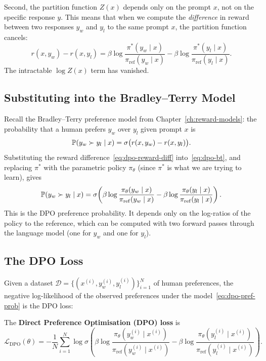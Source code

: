 Second, the partition function $Z(x)$ depends only on the prompt $x$, not on the specific response $y$. This means that when we compute the \emph{difference} in reward between two responses $y_w$ and $y_l$ to the same prompt $x$, the partition function cancels:
\begin{equation}
\label{eq:dpo-reward-diff}
r(x, y_w) - r(x, y_l)
= \beta\log\frac{\pi^*(y_w \mid x)}{\pi_\mathrm{ref}(y_w \mid x)}
- \beta\log\frac{\pi^*(y_l \mid x)}{\pi_\mathrm{ref}(y_l \mid x)}.
\end{equation}
The intractable $\log Z(x)$ term has vanished.

\subsection{Substituting into the Bradley--Terry Model}

Recall the Bradley--Terry preference model from Chapter~\ref{ch:reward-models}: the probability that a human prefers $y_w$ over $y_l$ given prompt $x$ is
\begin{equation}
\label{eq:dpo-bt}
\mathbb{P}(y_w \succ y_l \mid x) = \sigma\bigl(r(x, y_w) - r(x, y_l)\bigr).
\end{equation}
Substituting the reward difference~\eqref{eq:dpo-reward-diff} into~\eqref{eq:dpo-bt}, and replacing $\pi^*$ with the parametric policy $\pi_\theta$ (since $\pi^*$ is what we are trying to learn), gives
\begin{equation}
\label{eq:dpo-pref-prob}
\mathbb{P}(y_w \succ y_l \mid x) = \sigma\!\left(\beta\log\frac{\pi_\theta(y_w \mid x)}{\pi_\mathrm{ref}(y_w \mid x)}
- \beta\log\frac{\pi_\theta(y_l \mid x)}{\pi_\mathrm{ref}(y_l \mid x)}\right).
\end{equation}
This is the DPO preference probability. It depends only on the log-ratios of the policy to the reference, which can be computed with two forward passes through the language model (one for $y_w$ and one for $y_l$).

\subsection{The DPO Loss}

Given a dataset $\mathcal{D} = \{(x^{(i)}, y_w^{(i)}, y_l^{(i)})\}_{i=1}^N$ of human preferences, the negative log-likelihood of the observed preferences under the model~\eqref{eq:dpo-pref-prob} is the DPO loss:

\begin{definition}
\label{def:dpo-loss}
The \textbf{Direct Preference Optimisation (DPO) loss} is
\begin{equation}
\label{eq:dpo-loss}
\boxed{
\mathcal{L}_\mathrm{DPO}(\theta)
= -\frac{1}{N}\sum_{i=1}^{N}
\log\sigma\!\left(
\beta\log\frac{\pi_\theta(y_w^{(i)} \mid x^{(i)})}{\pi_\mathrm{ref}(y_w^{(i)} \mid x^{(i)})}
- \beta\log\frac{\pi_\theta(y_l^{(i)} \mid x^{(i)})}{\pi_\mathrm{ref}(y_l^{(i)} \mid x^{(i)})}
\right).
}
\end{equation}
\end{definition}

